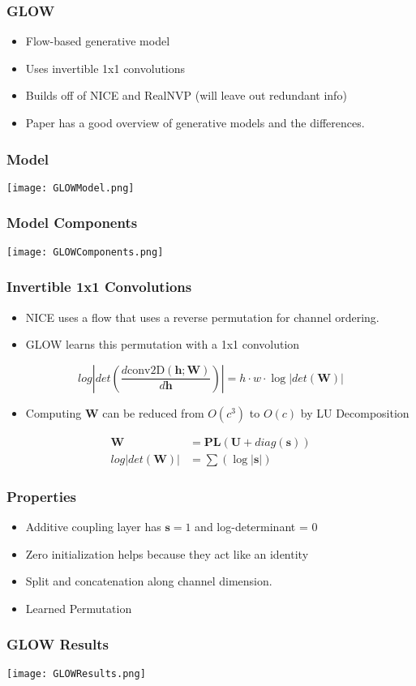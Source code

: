 \begin{frame}
\frametitle{GLOW}
    \begin{itemize}
        \item Flow-based generative model   
        \item Uses invertible 1x1 convolutions 
        \item Builds off of NICE and RealNVP (will leave out redundant info)
        \item Paper has a good overview of generative models and the
        differences.
    \end{itemize}
\end{frame}

\begin{frame}
\frametitle{Model}
\center\texttt{[image: GLOWModel.png]}
\end{frame}

\begin{frame}
\frametitle{Model Components}
\center\texttt{[image: GLOWComponents.png]}
\end{frame}

\begin{frame}
\frametitle{Invertible 1x1 Convolutions}
    \begin{itemize}
        \item NICE uses a flow that uses a reverse permutation for channel ordering.
        \item GLOW learns this permutation with a 1x1 convolution
    \end{itemize}
    \begin{equation}
        log \left| det \left(\frac{d \textrm{conv2D}(\mathbf{h};\mathbf{W})}
                {d\mathbf{h}}\right)\right| = h \cdot w \cdot \log|det(\mathbf{W})| 
    \end{equation}
    \begin{itemize}
        \item Computing $\mathbf{W}$ can be reduced from $O(c^3)$ to $O(c)$ by
        LU Decomposition
    \end{itemize}
    \begin{align*}
        \mathbf{W} &= \mathbf{PL}(\mathbf{U} + diag(\mathbf{s}))\\
        log|det(\mathbf{W})| &= \sum(\log|\mathbf{s}|)
    \end{align*}
\end{frame}

\begin{frame}
\frametitle{Properties}
    \begin{itemize}
        \item Additive coupling layer has $\mathbf{s}=1$ and log-determinant = 0
        \item Zero initialization helps because they act like an identity
        \item Split and concatenation along channel dimension.
        \item Learned Permutation
    \end{itemize}
\end{frame}

\begin{frame}
\frametitle{GLOW Results}
\center\texttt{[image: GLOWResults.png]}
\end{frame}
